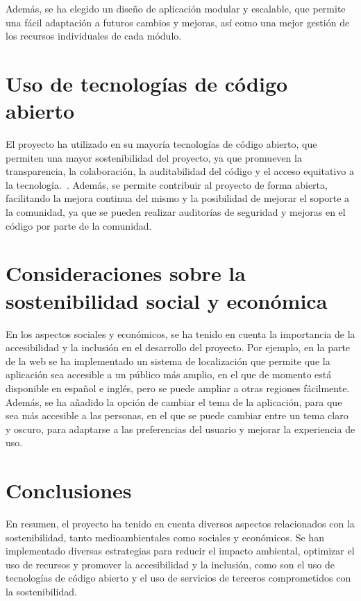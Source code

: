 Además, se ha elegido un diseño de aplicación modular y escalable, que permite una fácil adaptación a futuros cambios y mejoras, así como una mejor gestión de los recursos individuales de cada módulo.

\section{Uso de tecnologías de código abierto}
El proyecto ha utilizado en su mayoría tecnologías de código abierto, que permiten una mayor sostenibilidad del proyecto, ya que promueven la transparencia, la colaboración, la auditabilidad del código y el acceso equitativo a la tecnología.~\cite{SosOpen}. Además, se permite contribuir al proyecto de forma abierta, facilitando la mejora continua del mismo y la posibilidad de mejorar el soporte a la comunidad, ya que se pueden realizar auditorías de seguridad y mejoras en el código por parte de la comunidad.


\section{Consideraciones sobre la sostenibilidad social y económica}
En los aspectos sociales y económicos, se ha tenido en cuenta la importancia de la accesibilidad y la inclusión en el desarrollo del proyecto. Por ejemplo, en la parte de la web se ha implementado un sistema de localización que permite que la aplicación sea accesible a un público más amplio, en el que de momento está disponible en español e inglés, pero se puede ampliar a otras regiones fácilmente. Además, se ha añadido la opción de cambiar el tema de la aplicación, para que sea más accesible a las personas, en el que se puede cambiar entre un tema claro y oscuro, para adaptarse a las preferencias del usuario y mejorar la experiencia de uso.


\section{Conclusiones}
En resumen, el proyecto ha tenido en cuenta diversos aspectos relacionados con la sostenibilidad, tanto medioambientales como sociales y económicos. Se han implementado diversas estrategias para reducir el impacto ambiental, optimizar el uso de recursos y promover la accesibilidad y la inclusión, como son el uso de tecnologías de código abierto y el uso de servicios de terceros comprometidos con la sostenibilidad.